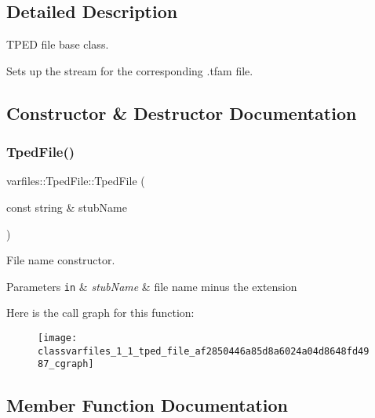 \subsection{Detailed Description}
T\+P\+ED file base class. 

Sets up the stream for the corresponding .tfam file. 

\subsection{Constructor \& Destructor Documentation}
\mbox{\label{classvarfiles_1_1_tped_file_af2850446a85d8a6024a04d8648fd4987}} 
\subsubsection{\texorpdfstring{Tped\+File()}{TpedFile()}}
{\footnotesize\ttfamily varfiles\+::\+Tped\+File\+::\+Tped\+File (\begin{DoxyParamCaption}\item[{const string \&}]{stub\+Name }\end{DoxyParamCaption})\hspace{0.3cm}{\ttfamily [inline]}}



File name constructor. 


\begin{DoxyParams}[1]{Parameters}
\mbox{\tt in}  & {\em stub\+Name} & file name minus the extension \\
\hline
\end{DoxyParams}
Here is the call graph for this function\+:\nopagebreak
\begin{figure}[H]
\begin{center}
\leavevmode
\texttt{[image: classvarfiles\_1\_1\_tped\_file\_af2850446a85d8a6024a04d8648fd4987\_cgraph]}
\end{center}
\end{figure}


\subsection{Member Function Documentation}
\mbox{\label{classvarfiles_1_1_tped_file_ae0151eb62fa59641ba375ada61458e7c}} 
